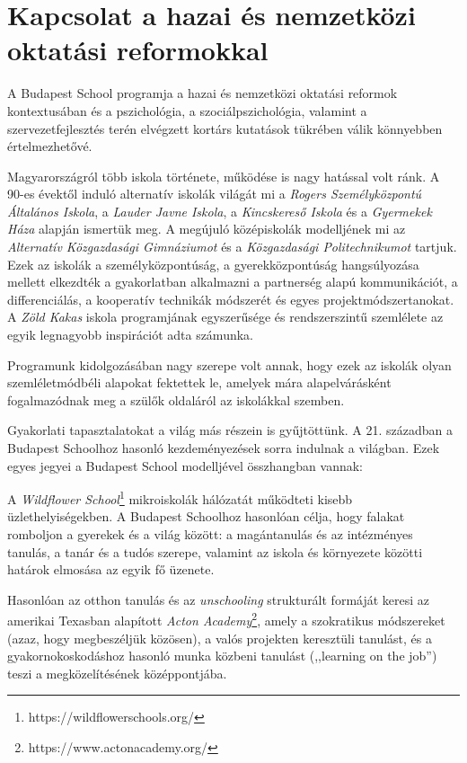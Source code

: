 \section{Kapcsolat a hazai és nemzetközi oktatási reformokkal}
\label{sec:kapcsolat_reformokkal}

A Budapest School programja a hazai és nemzetközi oktatási reformok kontextusában és a pszichológia, a szociálpszichológia, valamint a szervezetfejlesztés terén elvégzett kortárs kutatások tükrében válik könnyebben értelmezhetővé.

Magyarországról több iskola története, működése is nagy hatással volt ránk. A 90-es évektől induló alternatív iskolák világát mi a \emph{Rogers Személyközpontú Általános Iskola}, a \emph{Lauder Javne Iskola}, a \emph{Kincskereső Iskola} és a \emph{Gyermekek Háza} alapján ismertük meg. A megújuló középiskolák modelljének mi az \emph{Alternatív Közgazdasági Gimnáziumot} és a \emph{Közgazdasági Politechnikumot} tartjuk. Ezek az iskolák a személyközpontúság, a gyerekközpontúság hangsúlyozása mellett elkezdték a gyakorlatban alkalmazni a partnerség alapú kommunikációt, a differenciálás, a kooperatív technikák módszerét és egyes projektmódszertanokat. A \emph{Zöld Kakas} iskola programjának egyszerűsége és rendszerszintű szemlélete az egyik legnagyobb inspirációt adta számunka.

Programunk kidolgozásában nagy szerepe volt annak, hogy ezek az iskolák olyan szemléletmódbéli alapokat fektettek le, amelyek mára alapelvárásként fogalmazódnak meg a szülők oldaláról az iskolákkal szemben.

Gyakorlati tapasztalatokat a világ más részein is gyűjtöttünk. A 21. században a Budapest Schoolhoz hasonló kezdeményezések sorra indulnak a világban. Ezek egyes jegyei a Budapest School modelljével összhangban vannak:

A \emph{Wildflower School}\footnote{https://wildflowerschools.org/} mikroiskolák hálózatát működteti kisebb üzlethelyiségekben. A Budapest Schoolhoz hasonlóan célja, hogy falakat romboljon a gyerekek és a világ között: a magántanulás és az intézményes tanulás, a tanár és a tudós szerepe, valamint az iskola és környezete közötti határok elmosása az egyik fő üzenete.

Hasonlóan az otthon tanulás és az  \emph{unschooling} strukturált formáját keresi az amerikai Texasban alapított \emph{Acton Academy}\footnote{https://www.actonacademy.org/}, amely a szokratikus módszereket (azaz, hogy megbeszéljük közösen), a valós projekten keresztüli tanulást, és a gyakornokoskodáshoz hasonló munka közbeni tanulást (,,learning on the job'') teszi a megközelítésének középpontjába.

